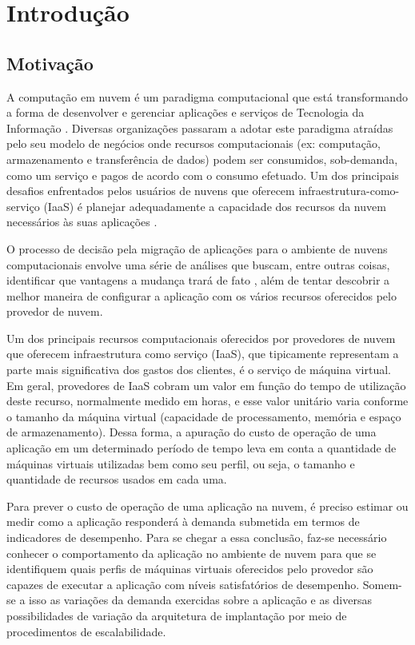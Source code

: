 \chapter[Introdução]{Introdução}
\section{Motivação}
A computação em nuvem é um paradigma computacional que está
transformando a forma de desenvolver e gerenciar aplicações e serviços de
Tecnologia da Informação \cite{Murugesan2014}. Diversas organizações passaram a adotar este paradigma
atraídas pelo seu modelo de negócios onde recursos computacionais (ex:
computação, armazenamento e transferência de dados) podem ser consumidos, sob-demanda, 
como um serviço e pagos de acordo com o consumo efetuado. Um dos principais
desafios enfrentados pelos usuários de nuvens que oferecem 
infraestrutura-como-serviço (IaaS) é planejar adequadamente a capacidade 
dos recursos da nuvem necessários às suas aplicações \cite{Menasce2009}.  

O processo de decisão pela migração de aplicações para o ambiente de nuvens 
computacionais envolve uma série de análises que buscam, entre outras coisas, 
identificar que vantagens a mudança trará de fato \cite{beserra2012cloudstep, 
rodero2010infrastructure}, além de tentar descobrir a melhor maneira de configurar 
a aplicação com os vários recursos oferecidos pelo provedor de nuvem.

Um dos principais recursos computacionais oferecidos por provedores de nuvem que oferecem infraestrutura como serviço (IaaS), que tipicamente representam a parte mais significativa dos gastos dos
clientes, é o serviço de máquina virtual. Em geral, provedores de IaaS cobram um
valor em função do tempo de utilização deste recurso, normalmente medido em horas, 
e esse valor unitário varia conforme o tamanho da máquina virtual (capacidade de 
processamento, memória e espaço de armazenamento). Dessa forma, a apuração do 
custo de operação de uma aplicação em um determinado período de tempo leva em 
conta a quantidade de máquinas virtuais utilizadas bem como seu perfil, ou seja, 
o tamanho e quantidade de recursos usados em cada uma.
 
Para prever o custo de operação de uma aplicação na nuvem, é preciso estimar ou 
medir como a aplicação responderá à demanda submetida em termos de indicadores de 
desempenho. Para se chegar a essa conclusão, faz-se necessário conhecer o 
comportamento da aplicação no ambiente de nuvem para que se identifiquem quais 
perfis de máquinas virtuais oferecidos pelo provedor são capazes de executar a 
aplicação com níveis satisfatórios de desempenho. Somem-se a isso as variações 
da demanda exercidas sobre a aplicação e as diversas possibilidades de variação 
da arquitetura de implantação por meio de procedimentos de escalabilidade.
 
